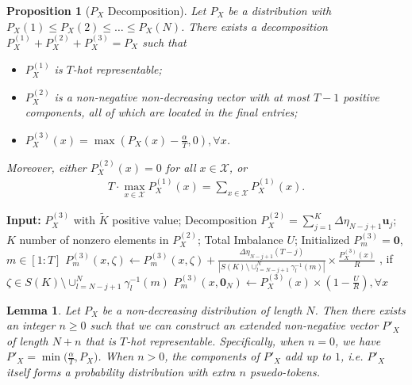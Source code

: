 \documentclass[10pt,a4paper]{amsart}
\newtheorem{prop}{Proposition}
\newtheorem{lemma}{Lemma}
\newcommand{\cX}{\mathcal{X}}
\begin{document}
\begin{prop}[$P_X$ Decomposition] \label{prop:split_px}
    Let $P_X$ be a distribution with $P_X(1) \leq P_X(2) \leq \dots \leq P_X(N)$. There exists a decomposition $P_X^{(1)}+P_X^{(2)}+P_X^{(3)} = P_X$ such that 
    \begin{itemize}
        \item[1.] $P_X^{(1)}$ is $T$-hot representable;
        \item[2.] $P_X^{(2)}$ is a non-negative non-decreasing vector with at most $T-1$  positive components, all of which are located in the final entries;
        \item[3.] $P_X^{(3)}(x) = \max(P_X(x) -\tfrac{\alpha}{T}, 0), \forall x$.
    \end{itemize}
    Moreover, either $P^{(2)}_X(x)=0$ for all $x\in\cX$, or 
    \begin{align}
    T\cdot\max_{x\in \cX}P_X^{(1)}(x)=\sum_{x\in\cX}P_X^{(1)}(x).\label{eqn:PX2}
    \end{align}
\end{prop}

\begin{algorithm}[h]
\caption{$P_m^{(3)}$ Construction}
\label{alg:pm3_proportional_fill}
\begin{algorithmic}[1]
\State \textbf{Input:} $P_X^{(3)}$ with $\tilde{K}$ positive value; Decomposition $P_X^{(2)} = \sum_{j=1}^K \Delta\eta_{N-j+1}\boldsymbol{u}_j$; $K$ number of nonzero elements in $P_X^{(2)}$; Total Imbalance $U$; Initialized $P_m^{(3)} =\mathbf{0}$, $m \in [1:T]$
        \State $P_m^{(3)}(x,\zeta) \gets P_m^{(3)}(x,\zeta) + \frac{\Delta\eta_{N-j+1}(T-j)}{|S(K) \setminus \cup_{l=N-j+1}^N \gamma^{-1}_l(m)|}\times \frac{P_X^{(3)}(x)}{R}$ , if $\zeta \in S(K) \setminus \cup_{l=N-j+1}^N \gamma^{-1}_l(m)  $ \label{alg-eq:allocate_imbalance}
    \EndFor
\EndFor
\State $P_m^{(3)}(x, \mathbf{0}_N) \gets P_X^{(3)}(x) \times (1-\frac{U}{R}), \forall x$
\end{algorithmic}
\end{algorithm}

\begin{lemma} \label{lemma:extend_PX}
    Let \(P_X\) be a non-decreasing distribution of length \(N\). Then there exists an integer \(n \ge 0\) such that we can construct an extended non-negative vector \(P'_X\) of length \(N + n\) that is \(T\)-hot representable. Specifically, when \(n = 0\), we have \(P'_X = \min \bigl(\tfrac{\alpha}{T}, P_X\bigr)\). When \(n > 0\), the components of \(P'_X\) add up to \(1\), i.e. \(P'_X\) itself forms a probability distribution with extra $n$ psuedo-tokens. 
\end{lemma}
\end{document}
